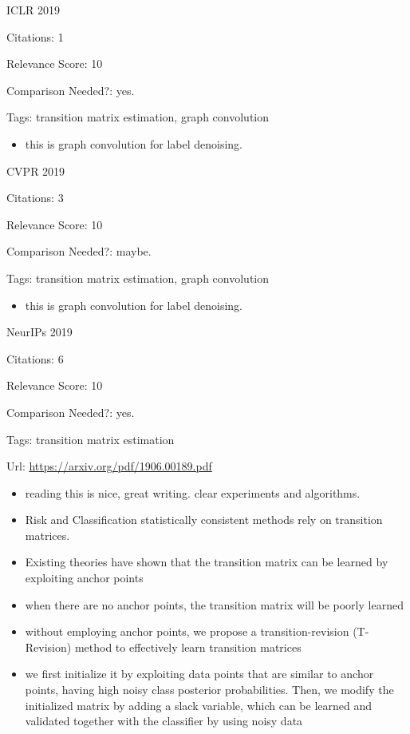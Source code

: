 \documentclass[11pt]{article}
\begin{document}

\noindent ICLR 2019

\noindent Citations: 1

\noindent Relevance Score: 10

\noindent Comparison Needed?: yes.

\noindent Tags: transition matrix estimation, graph convolution

\begin{itemize}
\item this is graph convolution for label denoising.
\end{itemize}

\vspace{2cm}

\noindent CVPR 2019

\noindent Citations: 3

\noindent Relevance Score: 10

\noindent Comparison Needed?: maybe.

\noindent Tags: transition matrix estimation, graph convolution

\begin{itemize}
\item this is graph convolution for label denoising.
\end{itemize}


\vspace{2cm}

\noindent NeurIPs 2019

\noindent Citations: 6

\noindent Relevance Score: 10

\noindent Comparison Needed?: yes.

\noindent Tags: transition matrix estimation

\noindent Url: \url{https://arxiv.org/pdf/1906.00189.pdf}

\begin{itemize}
\item reading this is nice, great writing. clear experiments and algorithms.
\item Risk and Classification statistically consistent methods rely on transition matrices. 
\item Existing theories have shown that the transition matrix can be learned by exploiting anchor points
\item when there are no anchor points, the transition matrix will be poorly learned
\item without employing anchor points, we propose a transition-revision (T-Revision) method to effectively learn transition matrices
\item we first initialize it by exploiting data points that are similar to anchor points, having high noisy class posterior probabilities. Then, we modify the initialized matrix by adding a slack variable, which can be learned and validated together with the classifier by using noisy data
\end{itemize}
\end{document}
